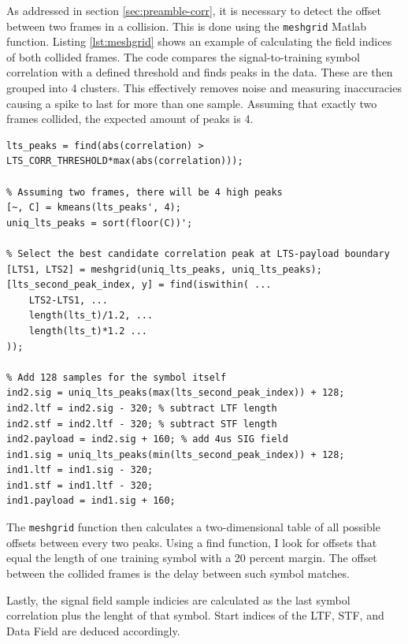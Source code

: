 As addressed in section \ref{sec:preamble-corr}, it is necessary to detect the offset between two frames in a collision. This is done using the \texttt{meshgrid} Matlab function. Listing \ref{lst:meshgrid} shows an example of calculating the field indices of both collided frames. The code compares the signal-to-training symbol correlation with a defined threshold and finds peaks in the data. These are then grouped into 4 clusters. This effectively removes noise and measuring inaccuracies causing a spike to last for more than one sample. Assuming that exactly two frames collided, the expected amount of peaks is 4.

\begin{lstlisting}[captionpos=b,caption={Collision Offset Detection using Meshgrid},label=lst:meshgrid]
% Find peaks above a parametrized threshold
lts_peaks = find(abs(correlation) > LTS_CORR_THRESHOLD*max(abs(correlation)));

% Assuming two frames, there will be 4 high peaks
[~, C] = kmeans(lts_peaks', 4);
uniq_lts_peaks = sort(floor(C))';

% Select the best candidate correlation peak at LTS-payload boundary
[LTS1, LTS2] = meshgrid(uniq_lts_peaks, uniq_lts_peaks);
[lts_second_peak_index, y] = find(iswithin( ...
    LTS2-LTS1, ...
    length(lts_t)/1.2, ...
    length(lts_t)*1.2 ...
));

% Add 128 samples for the symbol itself
ind2.sig = uniq_lts_peaks(max(lts_second_peak_index)) + 128;
ind2.ltf = ind2.sig - 320; % subtract LTF length
ind2.stf = ind2.ltf - 320; % subtract STF length
ind2.payload = ind2.sig + 160; % add 4us SIG field
ind1.sig = uniq_lts_peaks(min(lts_second_peak_index)) + 128;
ind1.ltf = ind1.sig - 320;
ind1.stf = ind1.ltf - 320;
ind1.payload = ind1.sig + 160;
\end{lstlisting}

The \texttt{meshgrid} function then calculates a two-dimensional table of all possible offsets between every two peaks. Using a find function, I look for offsets that equal the length of one training symbol with a 20 percent margin.  The offset between the collided frames is the delay between such symbol matches.

Lastly, the signal field sample indicies are calculated as the last symbol correlation plus the lenght of that symbol. Start indices of the \gls{LTF}, \gls{STF}, and Data Field are deduced accordingly.
